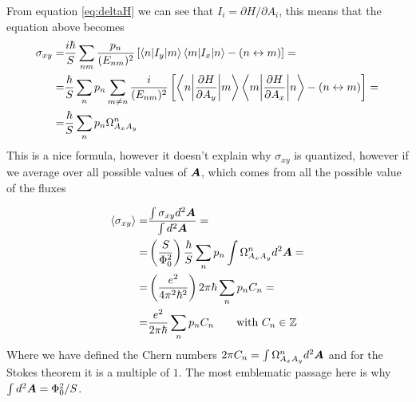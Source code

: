 From equation \ref{eq:deltaH} we can see that $I_i=\partial H/\partial A_i$, this means that the equation above becomes
\begin{equation}
    \begin{split}
        \sigma_{xy}=&
        \frac{i\hbar}S\sum_{nm}\frac{p_n}{(E_{nm})^2}\left[
        \braket{n|I_y}{m}\braket{m|I_x}{n} - (n\leftrightarrow m)
    \right]=\\
    =&\frac \hbar S\sum_{n}p_n\sum_{m\neq n}\frac{i}{(E_{nm})^2}\left[
    \braket{n\bigg|\frac{\partial H}{\partial A_y}}{m}\braket{m\bigg|\frac{\partial H}{\partial A_x}}{n} - (n\leftrightarrow m)
    \right]=\\
    =&\frac \hbar S\sum_{n}p_n\Omega^n_{A_xA_y}
    \end{split}
\end{equation}
This is a nice formula, however it doesn't explain why $\sigma_{xy}$ is quantized, however if we average over all possible values of $\boldsymbol{A}$, which comes from all the possible value of the fluxes

\begin{equation}
    \begin{split}
        \langle\sigma_{xy}\rangle=&
        \frac{\int \sigma_{xy}d^2\boldsymbol{A}}{\int d^2\boldsymbol{A}}=\\
        =&\left(\frac{S}{\Phi_0^2}\right)\frac \hbar S\sum_np_n\int \Omega^n_{A_xA_y}d^2\boldsymbol{A} =\\
        =&\left(\frac{e^2}{4\pi^2\hbar^2}\right)2\pi\hbar\sum_np_nC_n=\\
        =&\frac{e^2}{2\pi\hbar}\sum_np_nC_n\quad \quad \text{with }C_n\in \mathbb Z
    \end{split}
    \label{eq:quantized sigma}
\end{equation}
Where we have defined the Chern numbers $2\pi C_n=\int \Omega^n_{A_xA_y}d^2\boldsymbol{A}$ and for the Stokes theorem it is a multiple of $1$. The most emblematic passage here is why $\int d^2\boldsymbol{A}=\Phi_0^2/S$.\\

